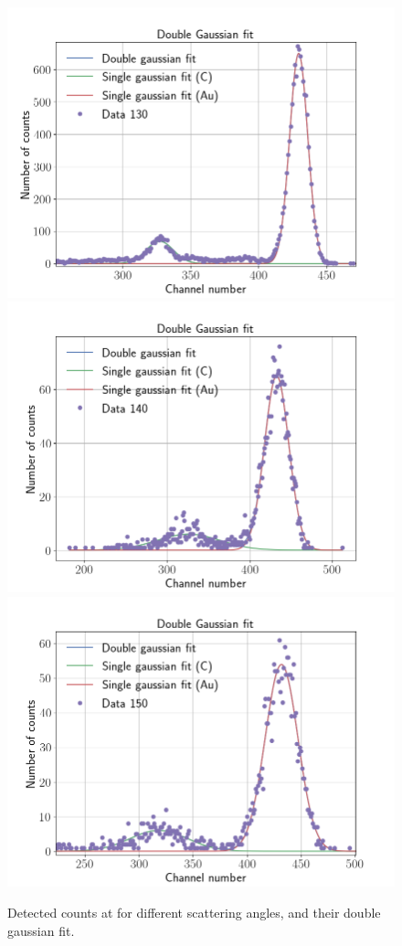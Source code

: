 \begin{figure}
\includegraphics[width=0.99\columnwidth]{Data_130}
\includegraphics[width=0.99\columnwidth]{Data_140}
\includegraphics[width=0.99\columnwidth]{Data_150}
\caption{Detected counts at for different scattering angles, and their double gaussian fit.}
\label{fig_angular_dependency}
\end{figure}
